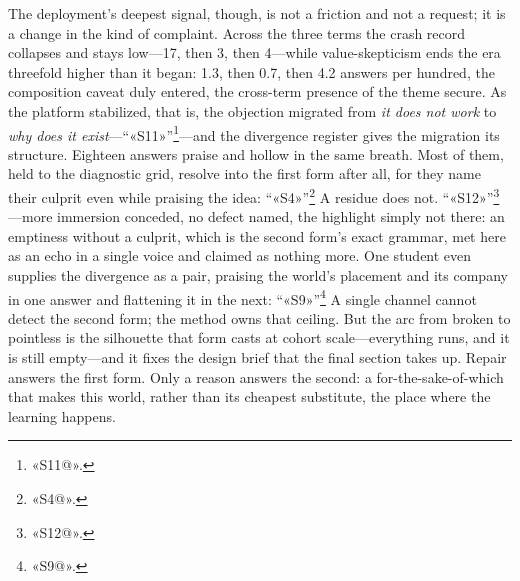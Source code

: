 The deployment's deepest signal, though, is not a friction and not a request; it is a change in the kind of complaint. Across the three terms the crash record collapses and stays low---17, then 3, then 4---while value-skepticism ends the era threefold higher than it began: 1.3, then 0.7, then 4.2 answers per hundred, the composition caveat duly entered, the cross-term presence of the theme secure. As the platform stabilized, that is, the objection migrated from \textit{it does not work} to \textit{why does it exist}---``«S11»''\footnote{«S11@».}---and the divergence register gives the migration its structure. Eighteen answers praise and hollow in the same breath. Most of them, held to the diagnostic grid, resolve into the first form after all, for they name their culprit even while praising the idea: ``«S4»''\footnote{«S4@».} A residue does not. ``«S12»''\footnote{«S12@».}---more immersion conceded, no defect named, the highlight simply not there: an emptiness without a culprit, which is the second form's exact grammar, met here as an echo in a single voice and claimed as nothing more. One student even supplies the divergence as a pair, praising the world's placement and its company in one answer and flattening it in the next: ``«S9»''\footnote{«S9@».} A single channel cannot detect the second form; the method owns that ceiling. But the arc from broken to pointless is the silhouette that form casts at cohort scale---everything runs, and it is still empty---and it fixes the design brief that the final section takes up. Repair answers the first form. Only a reason answers the second: a for-the-sake-of-which that makes this world, rather than its cheapest substitute, the place where the learning happens.

